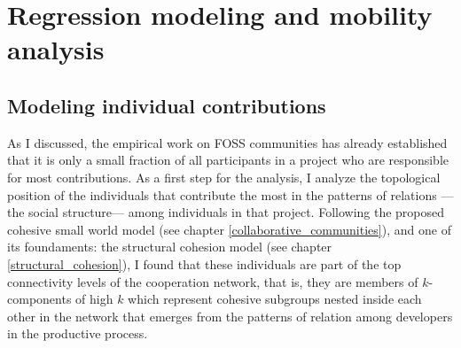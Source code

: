 \section{Regression modeling and mobility analysis}

\subsection{Modeling individual contributions}

As I discussed, the empirical work on FOSS communities has already established that it is only a small fraction of all participants in a project who are responsible for most contributions. As a first step for the analysis, I analyze the topological position of the individuals that contribute the most in the patterns of relations ---the social structure--- among individuals in that project. Following the proposed cohesive small world model (see chapter \ref{collaborative_communities}), and one of its foundaments: the structural cohesion model \citep{moody:2003} (see chapter \ref{structural_cohesion}), I found that these individuals are part of the top connectivity levels of the cooperation network, that is, they are members of $k$-components of high $k$ which represent cohesive subgroups nested inside each other in the network that emerges from the patterns of relation among developers in the productive process. 

